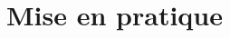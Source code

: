 \documentclass{beamer}
\begin{document}
\begin{comment}

\begin{frame}
\frametitle{Theorem}
\begin{theorem}[Mass--energy equivalence]
$E = mc^2$
\end{theorem}
\end{frame}


\begin{frame}[fragile] %
\frametitle{Verbatim}
\begin{example}[Theorem Slide Code]
\begin{verbatim}
\begin{frame}
\frametitle{Theorem}
\begin{theorem}[Mass--energy equivalence]
$E = mc^2$
\end{theorem}
\end{frame}\end{verbatim}
\end{example}
\end{frame}


\begin{frame}
\frametitle{Figure}
Uncomment the code on this slide to include your own image from the same directory as the template .TeX file.
\end{frame}


\begin{frame}[fragile] %
\frametitle{Citation}
An example of the \verb|\cite| command to cite within the presentation:\\~

This statement requires citation \cite{p1}.
\end{frame}

\end{comment}


\section{Mise en pratique}
\end{document}
